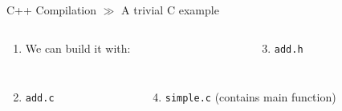 \documentclass[10pt]{beamer}
\begin{document}
\begin{frame}{C++ Compilation $\gg$ A trivial C example}
\begin{columns}
	\begin{column}{0.675\textwidth}
		\begin{enumerate}
			\item We can build it with:
			\inputminted[bgcolor=lightGreyCustom,fontsize=\scriptsize]{sh}{./resources/build_trivial_c_program.sh}
		\end{enumerate}
	\end{column}
	\begin{column}{0.37\textwidth}  %
		\begin{enumerate}\setcounter{enumi}{2}
			\item \texttt{add.h}
			\inputminted[bgcolor=lightGreyCustom,fontsize=\scriptsize]{c}{./resources/add.h}
		\end{enumerate}
	\end{column}
\end{columns}
\vspace{-3mm}
\begin{columns}
	\begin{column}{0.4\textwidth}
		\begin{enumerate}\setcounter{enumi}{1}
			\item \texttt{add.c}
			\inputminted[bgcolor=lightGreyCustom,fontsize=\scriptsize]{c}{./resources/add.c}
		\end{enumerate}
	\end{column}
	\begin{column}{0.6\textwidth}  %
		\begin{enumerate}\setcounter{enumi}{3}
			\item \texttt{simple.c} (contains main function)
			\inputminted[bgcolor=lightGreyCustom,fontsize=\scriptsize]{c}{./resources/simple.c}
		\end{enumerate}
	\end{column}
\end{columns}
\end{frame}
\end{document}
